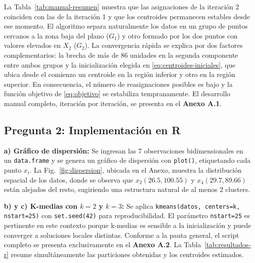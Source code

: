 \documentclass[10pt,a4paper]{article}
\begin{document}
La Tabla~\ref{tab:manual-resumen} muestra que las asignaciones de la iteraci\'on 2 coinciden con las de la iteraci\'on 1 y que los centroides permanecen estables desde ese momento. El algoritmo separa naturalmente los datos en un grupo de puntos cercanos a la zona baja del plano ($G_1$) y otro formado por los dos puntos con valores elevados en $X_2$ ($G_2$). La convergencia r\'apida se explica por dos factores complementarios: la brecha de m\'as de 86 unidades en la segunda componente entre ambos grupos y la inicializaci\'on elegida en \eqref{eq:centroides-iniciales}, que ubica desde el comienzo un centroide en la regi\'on inferior y otro en la regi\'on superior. En consecuencia, el n\'umero de reasignaciones posibles es bajo y la funci\'on objetivo de \eqref{eq:objetivo} se estabiliza tempranamente. El desarrollo manual completo, iteraci\'on por iteraci\'on, se presenta en el \textbf{Anexo A.1}.

\subsection{Pregunta 2: Implementaci\'on en R}

\textbf{a) Gr\'afico de dispersi\'on:} Se ingresan las 7 observaciones bidimensionales en un \texttt{data.frame} y se genera un gr\'afico de dispersi\'on con \texttt{plot()}, etiquetando cada punto $x_i$. La Fig.~\ref{fig:dispersion}, ubicada en el Anexo, muestra la distribuci\'on espacial de los datos, donde se observa que $x_2(26.5, 100.55)$ y $x_4(29.7, 89.66)$ est\'an alejados del resto, sugiriendo una estructura natural de al menos 2 clusters.

\textbf{b) y c) K-medias con $k=2$ y $k=3$:} Se aplica \texttt{kmeans(datos, centers=k, nstart=25)} con \texttt{set.seed(42)} para reproducibilidad. El par\'ametro \texttt{nstart=25} es pertinente en este contexto porque k-medias es sensible a la inicializaci\'on y puede converger a soluciones locales distintas. Conforme a la pauta general, el script completo se presenta exclusivamente en el \textbf{Anexo A.2}. La Tabla~\ref{tab:resultados-r} resume simult\'aneamente las particiones obtenidas y los centroides estimados.
\end{document}
